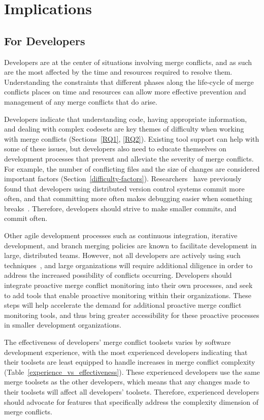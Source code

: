 \section{Implications}\label{implications}

\subsection{For Developers}
Developers are at the center of situations involving merge conflicts, and as such are the most affected by the time and resources required to resolve them.
Understanding the constraints that different phases along the life-cycle of merge conflicts places on time and resources can allow more effective prevention and management of any merge conflicts that do arise.

Developers indicate that understanding code, having appropriate information, and dealing with complex codesets are key themes of difficulty when working with merge conflicts (Sections~\ref{RQ1}, \ref{RQ2}).
Existing tool support can help with some of these issues, but developers also need to educate themselves on development processes that prevent and alleviate the severity of merge conflicts. 
For example, the number of conflicting files and the size of changes are considered important factors (Section~\ref{difficulty-factors}).
Researchers~\cite{brindescu2014versioncontrol} have previously found that developers using distributed version control systems commit more often, and that committing more often makes debugging easier when something breaks~\cite{meyer2014continuous}.
Therefore, developers should strive to make smaller commits, and commit often.

Other agile development processes such as continuous integration, iterative development, and branch merging policies are known to facilitate development in large, distributed teams. 
However, not all developers are actively using such techniques~\cite{phillips2011branching}, and large organizations will require additional diligence in order to address the increased possibility of conflicts occurring.
Developers should integrate proactive merge conflict monitoring into their own processes, and seek to add tools that enable proactive monitoring within their organizations.
These steps will help accelerate the demand for additional proactive merge conflict monitoring tools, and thus bring greater accessibility for these proactive processes in smaller development organizations.

The effectiveness of developers' merge conflict toolsets varies by software development experience, with the most experienced developers indicating that their toolsets are least equipped to handle increases in merge conflict complexity (Table~\ref{experience_vs_effectiveness}).
These experienced developers use the same merge toolsets as the other developers, which means that any changes made to their toolsets will affect all developers' toolsets.
Therefore, experienced developers should advocate for features that specifically address the complexity dimension of merge conflicts.

